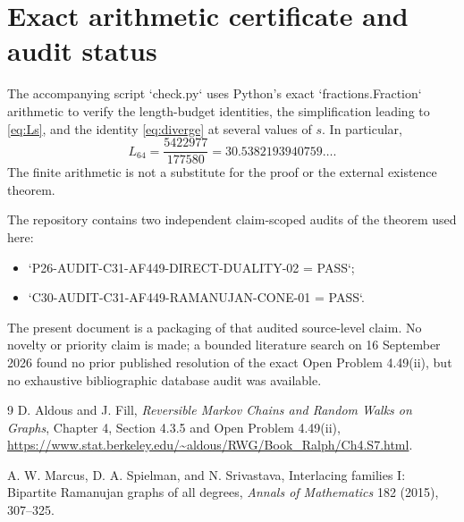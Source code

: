 \documentclass[11pt]{article}
\begin{document}
\section{Exact arithmetic certificate and audit status}
The accompanying script `check.py` uses Python's exact `fractions.Fraction` arithmetic to verify the length-budget identities, the simplification leading to \eqref{eq:Ls}, and the identity \eqref{eq:diverge} at several values of $s$.  In particular,
\[
 L_{64}=\frac{5422977}{177580}=30.5382193940759\ldots .
\]
The finite arithmetic is not a substitute for the proof or the external existence theorem.

The repository contains two independent claim-scoped audits of the theorem used here:
\begin{itemize}
\item `P26-AUDIT-C31-AF449-DIRECT-DUALITY-02 = PASS`;
\item `C30-AUDIT-C31-AF449-RAMANUJAN-CONE-01 = PASS`.
\end{itemize}
The present document is a packaging of that audited source-level claim.  No novelty or priority claim is made; a bounded literature search on 16 September 2026 found no prior published resolution of the exact Open Problem 4.49(ii), but no exhaustive bibliographic database audit was available.

\begin{thebibliography}{9}
D. Aldous and J. Fill,
\emph{Reversible Markov Chains and Random Walks on Graphs},
Chapter 4, Section 4.3.5 and Open Problem 4.49(ii),
\url{https://www.stat.berkeley.edu/~aldous/RWG/Book_Ralph/Ch4.S7.html}.

A. W. Marcus, D. A. Spielman, and N. Srivastava,
Interlacing families I: Bipartite Ramanujan graphs of all degrees,
\emph{Annals of Mathematics} 182 (2015), 307--325.
\end{thebibliography}
\end{document}
